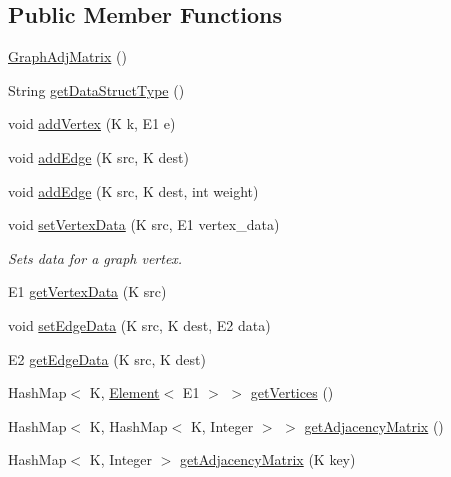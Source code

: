 \subsection*{Public Member Functions}
\begin{DoxyCompactItemize}
\item 
\mbox{\hyperlink{classbridges_1_1base_1_1_graph_adj_matrix_a8af4a2575890c3e68da7b39d800267bb}{Graph\+Adj\+Matrix}} ()
\item 
String \mbox{\hyperlink{classbridges_1_1base_1_1_graph_adj_matrix_a16ee088c4c53a9a5cdf3fbbad25cd1af}{get\+Data\+Struct\+Type}} ()
\item 
void \mbox{\hyperlink{classbridges_1_1base_1_1_graph_adj_matrix_a27b5ddb10a6615693460955b6bb3ee0c}{add\+Vertex}} (K k, E1 e)
\item 
void \mbox{\hyperlink{classbridges_1_1base_1_1_graph_adj_matrix_a477fbb5abbed6988e67b4b46b571e87c}{add\+Edge}} (K src, K dest)
\item 
void \mbox{\hyperlink{classbridges_1_1base_1_1_graph_adj_matrix_ad9b05b61e9592fa94045d7b59971b206}{add\+Edge}} (K src, K dest, int weight)
\item 
void \mbox{\hyperlink{classbridges_1_1base_1_1_graph_adj_matrix_a22eee632463a665e7016cf50916dfd83}{set\+Vertex\+Data}} (K src, E1 vertex\+\_\+data)
\begin{DoxyCompactList}\small\item\em Sets data for a graph vertex. \end{DoxyCompactList}\item 
E1 \mbox{\hyperlink{classbridges_1_1base_1_1_graph_adj_matrix_a36308a365d1c0f137ffb9a8e76a630f1}{get\+Vertex\+Data}} (K src)
\item 
void \mbox{\hyperlink{classbridges_1_1base_1_1_graph_adj_matrix_a72fe8bd594e3da28ba6e412de88576da}{set\+Edge\+Data}} (K src, K dest, E2 data)
\item 
E2 \mbox{\hyperlink{classbridges_1_1base_1_1_graph_adj_matrix_a3a3795c994ef9033ddb0b1d97029350b}{get\+Edge\+Data}} (K src, K dest)
\item 
Hash\+Map$<$ K, \mbox{\hyperlink{classbridges_1_1base_1_1_element}{Element}}$<$ E1 $>$ $>$ \mbox{\hyperlink{classbridges_1_1base_1_1_graph_adj_matrix_a6a000a302a1082bc2c55fbe8f511fce4}{get\+Vertices}} ()
\item 
Hash\+Map$<$ K, Hash\+Map$<$ K, Integer $>$ $>$ \mbox{\hyperlink{classbridges_1_1base_1_1_graph_adj_matrix_abe7f26cb9874744bc044df18b5d0eb84}{get\+Adjacency\+Matrix}} ()
\item 
Hash\+Map$<$ K, Integer $>$ \mbox{\hyperlink{classbridges_1_1base_1_1_graph_adj_matrix_a43f830cfe126f2be351f6d8c2fccc569}{get\+Adjacency\+Matrix}} (K key)

\end{DoxyCompactItemize}
